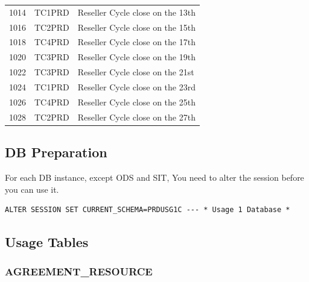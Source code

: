 \documentclass[12pt,twoside]{article}
\begin{document}
\begin{longtable}{c|l|l}
1014 & TC1PRD & Reseller Cycle close on the 13th\\
1016 & TC2PRD & Reseller Cycle close on the 15th\\
1018 & TC4PRD & Reseller Cycle close on the 17th\\
1020 & TC3PRD & Reseller Cycle close on the 19th\\
1022 & TC3PRD & Reseller Cycle close on the 21st\\
1024 & TC1PRD & Reseller Cycle close on the 23rd\\
1026 & TC4PRD & Reseller Cycle close on the 25th\\
1028 & TC2PRD & Reseller Cycle close on the 27th\\
\hline
\end{longtable}
\normalsize
\newpage
\subsection{DB Preparation}
\label{sec:orgheadline72}
For each DB instance, except ODS and SIT, You need to alter the
session before you can use it.\\
\begin{verbatim}
ALTER SESSION SET CURRENT_SCHEMA=PRDUSG1C --- * Usage 1 Database *
\end{verbatim}
\subsection{Usage Tables}
\label{sec:orgheadline86}
\subsubsection{AGREEMENT\_RESOURCE}
\label{sec:orgheadline73}
\footnotesize
\end{document}
